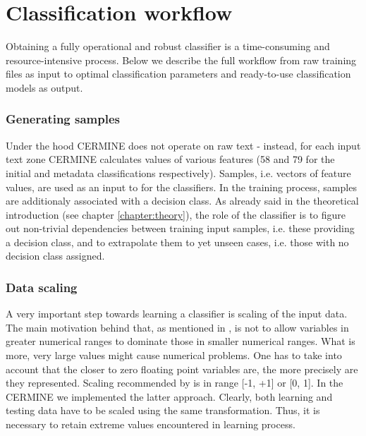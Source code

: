 \chapter{Classification workflow}\label{sec:classification_workflow}

Obtaining a fully operational and robust classifier is a time-consuming and resource-intensive process. Below we describe the full workflow from raw training files as input to optimal classification parameters and ready-to-use classification models as output.

\subsection{Generating samples}
Under the hood CERMINE does not operate on raw text - instead, for each input text zone CERMINE calculates values of various features (58 and 79 for the initial and metadata classifications respectively). Samples, i.e. vectors of feature values, are used as an input to for the classifiers. In the training process, samples are additionaly associated with a decision class. As already said in the theoretical introduction (see chapter \ref{chapter:theory}), the role of the classifier is to figure out non-trivial dependencies between training input samples, i.e. these providing a decision class, and to extrapolate them to yet unseen cases, i.e. those with no decision class assigned.

\subsection{Data scaling}
A very important step towards learning a classifier is scaling of the input data. The main motivation behind that, as mentioned in \cite{Chih-WeiHsu2010}, is not to allow variables in greater numerical ranges to dominate those in smaller numerical ranges. What is more, very large values might cause numerical problems. One has to take into account that the closer to zero floating point variables are, the more precisely are they represented. Scaling recommended by \cite{Chih-WeiHsu2010} is in range [-1, +1] or  [0, 1]. In the CERMINE we implemented the latter approach. Clearly, both learning and testing data have to be scaled using the same transformation. Thus, it is necessary to retain extreme values encountered in learning process.

